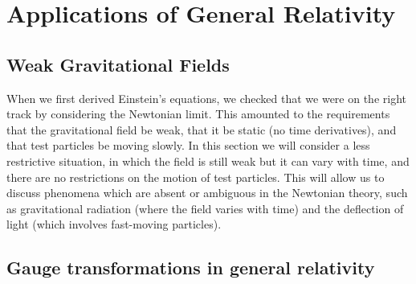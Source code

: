  
 
 
 
 
 
 
 
 
 
 
 
 
 
 
 
 
 
 
 
 
 
 
 
 
 



\newpage
\chapter{Applications of General Relativity}
\label{ch:GRapplications}


\section{Weak Gravitational Fields}
When we first derived Einstein’s equations, we checked that we were on the right track by
considering the Newtonian limit. This amounted to the requirements that the gravitational
field be weak, that it be static (no time derivatives), and that test particles be moving slowly.
In this section we will consider a less restrictive situation, in which the field is still weak but
it can vary with time, and there are no restrictions on the motion of test particles. This
will allow us to discuss phenomena which are absent or ambiguous in the Newtonian theory,
such as gravitational radiation (where the field varies with time) and the deflection of light
(which involves fast-moving particles).












\section{Gauge transformations in general relativity}

